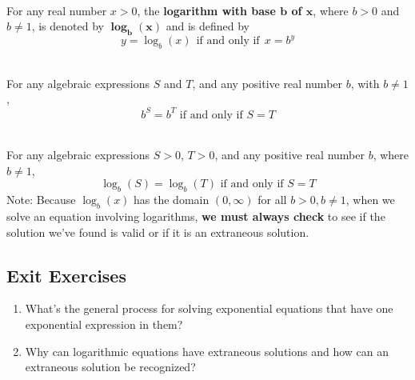 \begin{myDefinition}[Logarithm:]~\\[0.5mm]
For any real number $x>0$, the \textbf{logarithm with base $\boldsymbol{b}$ of $\boldsymbol{x}$}, where $b>0$ and $b\neq 1$, is denoted by $\boldsymbol{\log_b (x)}$ and is defined by
			$$
					y = \log_b (x) \ \  \textrm{if and only if} \ \  x = b^y
			$$
\end{myDefinition}


\begin{myDefinition}~\\[0.5mm]
For any algebraic expressions $S$ and $T$, and any positive real number $b$, with $b\neq1$,
$$b^S=b^T \text{ if and only if } S=T$$
\end{myDefinition}


\begin{myDefinition}~\\[0.5mm]
For any algebraic expressions $S>0$, $T>0$, and any positive real number $b$, where $b\neq1$,
$$\log_b(S)=\log_b(T) \text{ if and only if } S=T$$ 
Note: Because $\log_b(x)$ has the domain $(0,\infty)$ for all $b>0, b\neq1$, when we solve an equation involving logarithms, {\bf we must always check} to see if the solution we've found is valid or if it is an extraneous solution. 
\end{myDefinition}








 \newpage

\subsection*{Exit Exercises} \label{exit-exponential-and-logarithmic-equations}



\begin{myExit}
	\begin{enumerate}
		\item What's the general process for solving exponential equations that have one exponential expression in them?
		\vfill
		\item Why can logarithmic equations have extraneous solutions and how can an extraneous solution be recognized?
		\vfill
		\vfill
		\vfill
		\vfill
	\end{enumerate}
\end{myExit}
\vfill













